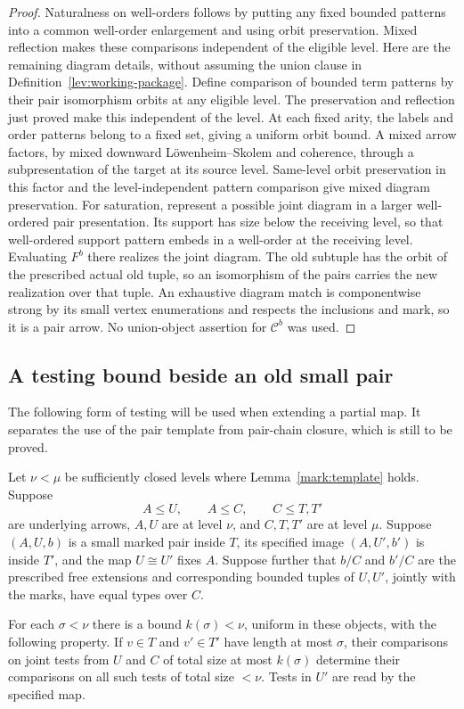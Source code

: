 \begin{proof}
Naturalness on well-orders follows by putting any fixed
bounded patterns into a common well-order enlargement
and using orbit preservation.  Mixed reflection makes
these comparisons independent of the eligible level.
Here are the remaining diagram details, without
assuming the union clause in
Definition~\ref{lev:working-package}.
Define comparison of bounded term patterns by their
pair isomorphism orbits at any eligible level.
The preservation and reflection just proved make
this independent of the level.  At each fixed arity,
the labels and order patterns belong to a fixed
set, giving a uniform orbit bound.  A mixed arrow
factors, by mixed downward Löwenheim--Skolem and
coherence, through a subpresentation of the target
at its source level.  Same-level orbit preservation
in this factor and the level-independent pattern
comparison give mixed diagram preservation.
For saturation, represent a possible joint diagram
in a larger well-ordered pair presentation.
Its support has size below the receiving level,
so that well-ordered support pattern embeds in a
well-order at the receiving level.  Evaluating
\(F^b\) there realizes the joint diagram.
The old subtuple has the orbit of the prescribed
actual old tuple, so an isomorphism of the pairs
carries the new realization over that tuple.
An exhaustive diagram match is componentwise strong by
its small vertex enumerations and respects the
inclusions and mark, so it is a pair arrow.
No union-object assertion for \(\mathcal C^b\) was used.
\end{proof}

\subsection{A testing bound beside an old small pair}

The following form of testing will be used when extending a partial
map.  It separates the use of the pair template from pair-chain
closure, which is still to be proved.

\begin{lemma}
\label{mark:two-part-testing}
Let \(\nu<\mu\) be sufficiently closed levels where
Lemma~\ref{mark:template} holds.  Suppose
\[
       A\leq U,\qquad A\leq C,\qquad C\leq T,T'
\]
are underlying arrows, \(A,U\) are at level \(\nu\), and \(C,T,T'\)
are at level \(\mu\).  Suppose \((A,U,b)\) is a small marked pair
inside \(T\), its specified image \((A,U',b')\) is inside \(T'\),
and the map \(U\cong U'\) fixes \(A\).
Suppose further that \(b/C\) and \(b'/C\) are the prescribed free
extensions and corresponding bounded tuples of \(U,U'\),
jointly with the marks, have equal types over \(C\).

For each \(\sigma<\nu\) there is a bound \(k(\sigma)<\nu\), uniform
in these objects, with the following property.  If \(v\in T\) and
\(v'\in T'\) have length at most \(\sigma\), their comparisons on
joint tests from \(U\) and \(C\) of total size at most
\(k(\sigma)\) determine their comparisons on all such tests of
total size \(<\nu\).  Tests in \(U'\) are read by the specified map.
\end{lemma}

